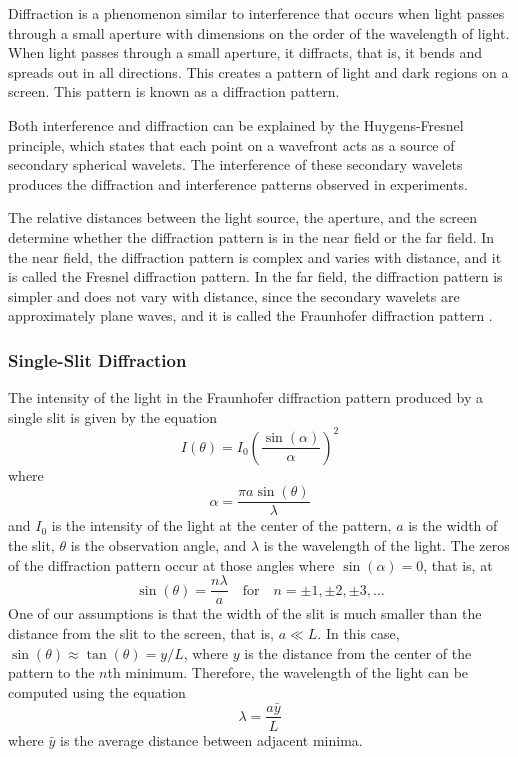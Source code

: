 \documentclass[10pt]{article}
\begin{document}
Diffraction is a phenomenon similar to interference that occurs when light passes through a small aperture with dimensions on the order of the wavelength of light. When light passes through a small aperture, it diffracts, that is, it bends and spreads out in all directions. This creates a pattern of light and dark regions on a screen. This pattern is known as a diffraction pattern.

Both interference and diffraction can be explained by the Huygens-Fresnel principle, which states that each point on a wavefront acts as a source of secondary spherical wavelets. The interference of these secondary wavelets produces the diffraction and interference patterns observed in experiments.

The relative distances between the light source, the aperture, and the screen determine whether the diffraction pattern is in the near field or the far field. In the near field, the diffraction pattern is complex and varies with distance, and it is called the Fresnel diffraction pattern. In the far field, the diffraction pattern is simpler and does not vary with distance, since the secondary wavelets are approximately plane waves, and it is called the Fraunhofer diffraction pattern \cite{Hecht_2017}.

\subsubsection*{Single-Slit Diffraction}

The intensity of the light in the Fraunhofer diffraction pattern produced by a single slit is given by the equation
\begin{equation}
  I(\theta) = I_0 \left( \frac{\sin(\alpha)}{\alpha} \right)^2
  \label{eq:single-slit-intensity}
\end{equation}
where
\begin{equation}
  \alpha = \frac{\pi a \sin(\theta)}{\lambda}
\end{equation}
and $I_0$ is the intensity of the light at the center of the pattern, $a$ is the width of the slit, $\theta$ is the observation angle, and $\lambda$ is the wavelength of the light. The zeros of the diffraction pattern occur at those angles where $\sin(\alpha) = 0$, that is, at
\begin{equation}
  \sin(\theta) = \frac{n \lambda}{a} \quad \text{for} \quad n = \pm 1, \pm 2, \pm 3, \ldots
\end{equation}
One of our assumptions is that the width of the slit is much smaller than the distance from the slit to the screen, that is, $a \ll L$. In this case, $\sin(\theta) \approx \tan(\theta) = y/L$, where $y$ is the distance from the center of the pattern to the $n$th minimum. Therefore, the wavelength of the light can be computed using the equation
\begin{equation}
  \lambda = \frac{a \bar{y}}{L}
\end{equation}
where $\bar{y}$ is the average distance between adjacent minima. 
\end{document}
